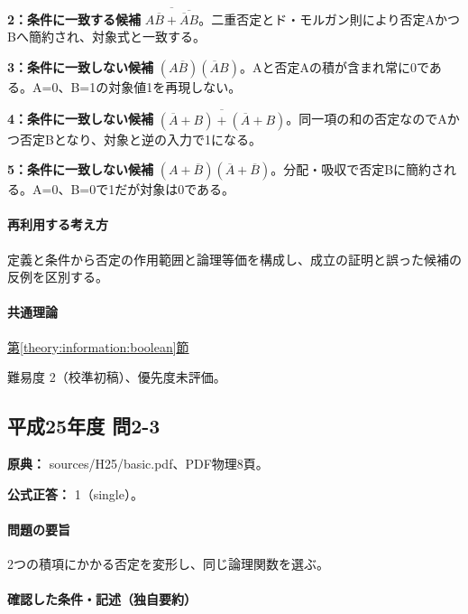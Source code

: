 \noindent\textbf{2：条件に一致する候補} \(\overline{A\overline B+\overline{\overline A B}}\)。二重否定とド・モルガン則により否定AかつBへ簡約され、対象式と一致する。\par

\noindent\textbf{3：条件に一致しない候補} \((A\overline B)(\overline A B)\)。Aと否定Aの積が含まれ常に0である。A=\allowbreak{}0、B=\allowbreak{}1の対象値1を再現しない。\par

\noindent\textbf{4：条件に一致しない候補} \(\overline{(\overline A+B)+(\overline A+B)}\)。同一項の和の否定なのでAかつ否定Bとなり、対象と逆の入力で1になる。\par

\noindent\textbf{5：条件に一致しない候補} \((A+\overline B)(\overline A+\overline B)\)。分配・吸収で否定Bに簡約される。A=\allowbreak{}0、B=\allowbreak{}0で1だが対象は0である。\par

\paragraph{再利用する考え方} 定義と条件から否定の作用範囲と論理等価を構成し、成立の証明と誤った候補の反例を区別する。

\paragraph{共通理論} \hyperref[theory:information:boolean]{第\ref*{theory:information:boolean}節}

\par 難易度 2（校準初稿）、優先度未評価。

\subsection{平成25年度 問2-3}
\label{q:h25-reg-basic-2-3}

\noindent\textbf{原典：} sources/H25/basic.pdf、PDF物理8頁。

\textbf{公式正答：} 1（single）。

\paragraph{問題の要旨} 2つの積項にかかる否定を変形し、同じ論理関数を選ぶ。

\paragraph{確認した条件・記述（独自要約）}\mbox{}\par

